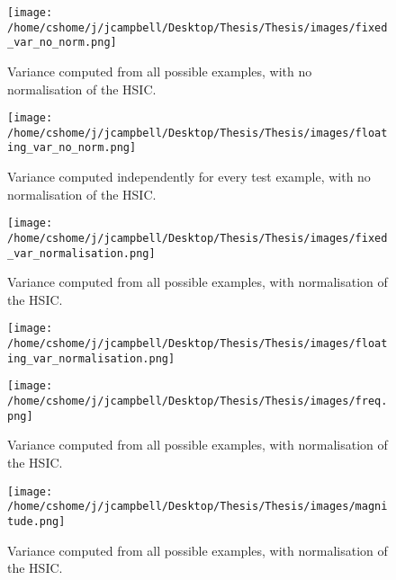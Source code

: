 \begin{figure}[h]
\texttt{[image: /home/cshome/j/jcampbell/Desktop/Thesis/Thesis/images/fixed\_var\_no\_norm.png]}
\caption{Variance computed from all possible examples, with no normalisation of the HSIC.\label{fixed_var_no_norm}}
\end{figure}
\begin{figure}[h]
\texttt{[image: /home/cshome/j/jcampbell/Desktop/Thesis/Thesis/images/floating\_var\_no\_norm.png]}
\caption{Variance computed independently for every test example, with no normalisation of the HSIC.\label{floating_var_no_norm}}
\end{figure}
\begin{figure}[h]
\texttt{[image: /home/cshome/j/jcampbell/Desktop/Thesis/Thesis/images/fixed\_var\_normalisation.png]}
\caption{Variance computed from all possible examples, with normalisation of the HSIC.\label{fixed_var_normalisation}}
\end{figure}
\begin{figure}[h]
\texttt{[image: /home/cshome/j/jcampbell/Desktop/Thesis/Thesis/images/floating\_var\_normalisation.png]}
\caption{\label{floating_var_normalisation}}
\end{figure}

\begin{figure}[h]
\texttt{[image: /home/cshome/j/jcampbell/Desktop/Thesis/Thesis/images/freq.png]}
\caption{Variance computed from all possible examples, with normalisation of the HSIC.\label{freq}}
\end{figure}

\begin{figure}[h]
\texttt{[image: /home/cshome/j/jcampbell/Desktop/Thesis/Thesis/images/magnitude.png]}
\caption{Variance computed from all possible examples, with normalisation of the HSIC.\label{magnitude}}
\end{figure}




















































